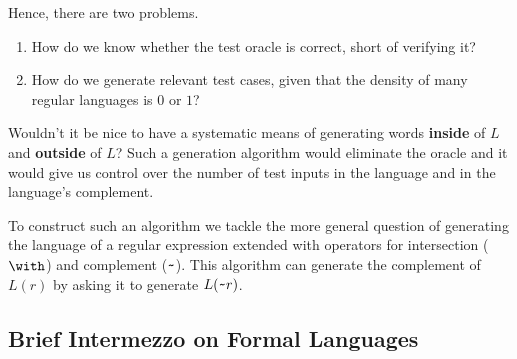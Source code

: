 Hence, there are two problems.
\begin{enumerate}
\item How do we know whether the test oracle is correct, short of
  verifying it?
\item How do we generate relevant test cases, given
  that the density of  many regular languages is
  $0$ or $1$?
\end{enumerate}


Wouldn't it be nice to have a systematic means
of generating words \textbf{inside} of $L$ and \textbf{outside} of
$L$? Such a generation algorithm would eliminate the oracle
and it would give us control over the number of test inputs
in the language and in the language's complement.

To construct such an algorithm we tackle the more general question of
generating the language of a regular expression extended with
operators for intersection ($\Rintersect{}{}$) and complement
($\texttt{\textasciitilde}{}$). This algorithm can generate the complement of
$L(r)$ by asking it to generate $L(\texttt{\textasciitilde} r)$.

\subsection{Brief Intermezzo on Formal Languages}
\label{sec:research-question}

